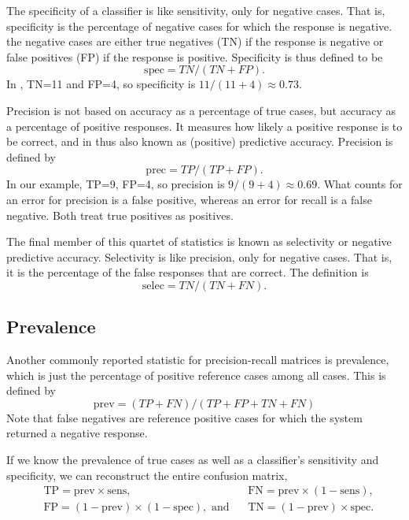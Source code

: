 The specificity of a classifier is like sensitivity, only for negative
cases.  That is, specificity is the percentage of negative cases for
which the response is negative.  the negative cases are either
true negatives (TN) if the response is negative or false positives (FP)
if the response is positive.  Specificity is thus defined to be
%
\begin{equation}
\mbox{spec} = TN/(TN+FP).
\end{equation}
%
In , TN=11 and FP=4, so
specificity is $11/(11+4) \approx 0.73$.

Precision is not based on accuracy as a percentage of true cases, but
accuracy as a percentage of positive responses.  It measures how
likely a positive response is to be correct, and in thus also known as
(positive) predictive accuracy.  Precision is defined by
%
\begin{equation}
\mbox{prec} = TP/(TP+FP).
\end{equation}
%
In our example, TP=9, FP=4, so precision is $9/(9+4) \approx 0.69$.
What counts for an error for precision is a false positive, whereas an
error for recall is a false negative.  Both treat true positives as
positives.

The final member of this quartet of statistics is known as
selectivity or negative predictive accuracy.  Selectivity is
like precision, only for negative cases.  That is, it 
is the percentage of the false responses that are correct.  The
definition is
%
\begin{equation}
\mbox{selec} = TN/(TN+FN).
\end{equation}
%


\subsection{Prevalence}

Another commonly reported statistic for precision-recall matrices is
prevalence, which is just the percentage of positive reference cases
among all cases.  This is defined by
%
\begin{equation}
\mbox{prev} = (TP+FN)/(TP+FP+TN+FN)
\end{equation}
%
Note that false negatives are reference positive cases for which
the system returned a negative response.   

If we know the prevalence of true cases as well as a classifier's
sensitivity and specificity, we can reconstruct the entire confusion
matrix,
%
\begin{align}
&\mbox{TP} = \mbox{prev} \times \mbox{sens},
\ \ \ \ 
&\mbox{FN} = \mbox{prev} \times (1 - \mbox{sens}),
\\
&\mbox{FP} = (1-\mbox{prev}) \times (1-\mbox{spec}), \mbox{ and}
\ \ \ \ 
&\mbox{TN} = (1-\mbox{prev}) \times \mbox{spec}.
\end{align}


